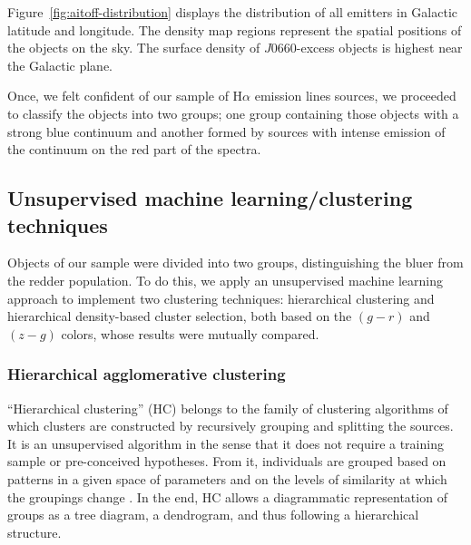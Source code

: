 \documentclass[fleqn,usenatbib]{mnras}
\begin{document}
Figure~\ref{fig:aitoff-distribution} displays the distribution of all emitters in Galactic 
latitude and longitude. The density map regions represent the spatial positions of the objects
on the sky. The surface density of $J$0660-excess objects is highest near the Galactic plane.

Once, we felt confident of our sample of H{$\alpha$} emission lines sources,
we proceeded to classify the objects into two groups; one group containing those
objects with a strong blue continuum and another formed by sources with  intense emission of the
continuum on the red part of the spectra. 

\subsection{Unsupervised machine learning/clustering techniques}
\label{sec:clustering}

Objects of our sample were
divided 
into two groups,
distinguishing the bluer from the redder population.
To do this, we apply an unsupervised machine learning approach to implement
 two clustering techniques: hierarchical clustering and hierarchical
density-based cluster selection, both based on the $(g - r)$ and $(z - g)$ colors, 
whose results were mutually compared. 

\subsubsection{Hierarchical agglomerative clustering}
\label{sec:Hierar}

``Hierarchical clustering'' (HC) belongs to the family of clustering algorithms of which clusters are constructed by recursively grouping and splitting the sources. 
It is an unsupervised algorithm in the sense that it does not require a training sample or pre-conceived hypotheses. 
From it, individuals are grouped 
based on patterns in a given space of parameters and on the levels of similarity
at which the groupings change \citep{Jain:1999}. 
In the end, HC allows a diagrammatic representation of groups as  a tree diagram, a dendrogram, and thus following a hierarchical structure.  
\end{document}
